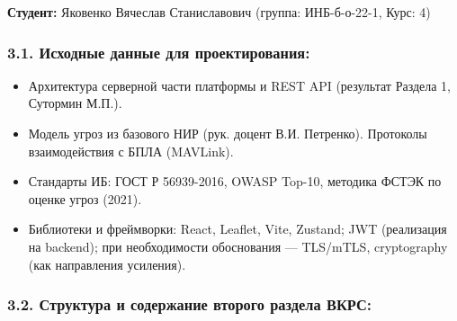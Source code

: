 \documentclass[14pt,a4paper]{extarticle}
\providecommand{\tightlist}{%
  \setlength{\itemsep}{0pt}\setlength{\parskip}{0pt}}
\begin{document}
\textbf{Студент:} Яковенко Вячеслав Станиславович (группа: ИНБ-б-о-22-1, Курс: 4)

\hypertarget{ux438ux441ux445ux43eux434ux43dux44bux435-ux434ux430ux43dux43dux44bux435-ux434ux43bux44f-ux43fux440ux43eux435ux43aux442ux438ux440ux43eux432ux430ux43dux438ux44f-1}{%
\subsubsection{3.1. Исходные данные для проектирования:}\label{ux438ux441ux445ux43eux434ux43dux44bux435-ux434ux430ux43dux43dux44bux435-ux434ux43bux44f-ux43fux440ux43eux435ux43aux442ux438ux440ux43eux432ux430ux43dux438ux44f-1}}

\begin{itemize}
\tightlist
\item
  Архитектура серверной части платформы и REST API (результат Раздела 1, Сутормин М.П.).
\item
  Модель угроз из базового НИР (рук. доцент В.И. Петренко). Протоколы взаимодействия с БПЛА (MAVLink).
\item
  Стандарты ИБ: ГОСТ Р 56939-2016, OWASP Top-10, методика ФСТЭК по оценке угроз (2021).
\item
  Библиотеки и фреймворки: React, Leaflet, Vite, Zustand; JWT (реализация на backend); при необходимости обоснования --- TLS/mTLS, cryptography (как направления усиления).
\end{itemize}

\hypertarget{ux441ux442ux440ux443ux43aux442ux443ux440ux430-ux438-ux441ux43eux434ux435ux440ux436ux430ux43dux438ux435-ux432ux442ux43eux440ux43eux433ux43e-ux440ux430ux437ux434ux435ux43bux430-ux432ux43aux440ux441}{%
\subsubsection{3.2. Структура и содержание второго раздела ВКРС:}\label{ux441ux442ux440ux443ux43aux442ux443ux440ux430-ux438-ux441ux43eux434ux435ux440ux436ux430ux43dux438ux435-ux432ux442ux43eux440ux43eux433ux43e-ux440ux430ux437ux434ux435ux43bux430-ux432ux43aux440ux441}}
\end{document}
